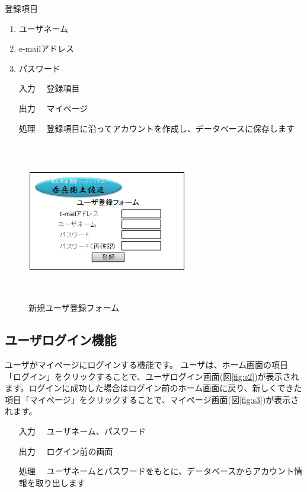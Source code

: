 \documentclass[a4j,titlepage]{jarticle}
\begin{document}
登録項目
\begin{enumerate}
  \item ユーザネーム
  \item e-mailアドレス
  \item パスワード
\end{enumerate}

\begin{enumerate}
  \item [入力]　登録項目
  \item [出力]　マイページ
  \item [処理]　登録項目に沿ってアカウントを作成し、データベースに保存します
\end{enumerate}

\begin{figure}[htbp]
  \begin{center}
  \includegraphics [height=7cm, width=7cm]{extrnal1_design_document_image/s1.eps}
  \caption{新規ユーザ登録フォーム}
  \label {fig:s1}
  \end{center}
\end{figure}

\newpage
\subsection{ユーザログイン機能}
ユーザがマイページにログインする機能です。
ユーザは、ホーム画面の項目「ログイン」をクリックすることで、ユーザログイン画面(図\ref{fig:s2})が表示されます。ログインに成功した場合はログイン前のホーム画面に戻り、新しくできた項目「マイページ」をクリックすることで、マイページ画面(図\ref{fig:s3})が表示されます。

\begin{enumerate}
  \item [入力]　ユーザネーム、パスワード
  \item [出力]　ログイン前の画面
  \item [処理]　ユーザネームとパスワードをもとに、データベースからアカウント情報を取り出します
\end{enumerate}
\end{document}
